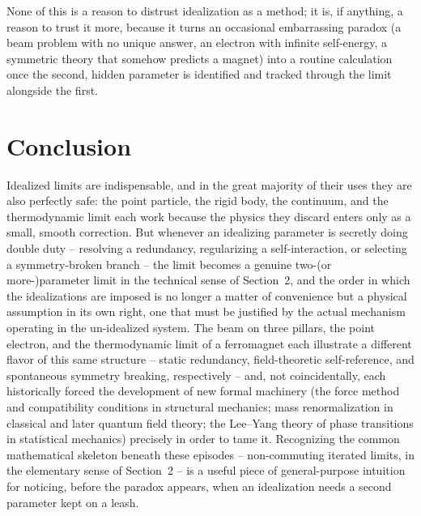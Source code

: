 \documentclass[11pt]{article}
\begin{document}
None of this is a reason to distrust idealization as a method; it is, if anything, a reason to trust it more, because it turns an occasional embarrassing paradox (a beam problem with no unique answer, an electron with infinite self-energy, a symmetric theory that somehow predicts a magnet) into a routine calculation once the second, hidden parameter is identified and tracked through the limit alongside the first.

\section{Conclusion}

Idealized limits are indispensable, and in the great majority of their uses they are also perfectly safe: the point particle, the rigid body, the continuum, and the thermodynamic limit each work because the physics they discard enters only as a small, smooth correction. But whenever an idealizing parameter is secretly doing double duty -- resolving a redundancy, regularizing a self-interaction, or selecting a symmetry-broken branch -- the limit becomes a genuine two-(or more-)parameter limit in the technical sense of Section~2, and the order in which the idealizations are imposed is no longer a matter of convenience but a physical assumption in its own right, one that must be justified by the actual mechanism operating in the un-idealized system. The beam on three pillars, the point electron, and the thermodynamic limit of a ferromagnet each illustrate a different flavor of this same structure -- static redundancy, field-theoretic self-reference, and spontaneous symmetry breaking, respectively -- and, not coincidentally, each historically forced the development of new formal machinery (the force method and compatibility conditions in structural mechanics; mass renormalization in classical and later quantum field theory; the Lee--Yang theory of phase transitions in statistical mechanics) precisely in order to tame it. Recognizing the common mathematical skeleton beneath these episodes -- non-commuting iterated limits, in the elementary sense of Section~2 -- is a useful piece of general-purpose intuition for noticing, before the paradox appears, when an idealization needs a second parameter kept on a leash.
\end{document}
